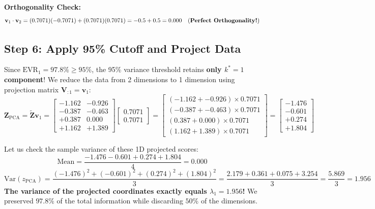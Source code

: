 \documentclass[11pt, a4paper]{article}
\begin{document}
\textbf{Orthogonality Check:}
$$\mathbf{v}_1 \cdot \mathbf{v}_2 = (0.7071)(-0.7071) + (0.7071)(0.7071) = -0.5 + 0.5 = 0.000 \quad \text{(\textbf{Perfect Orthogonality!})}$$

\subsection{Step 6: Apply 95\% Cutoff and Project Data}

Since $\text{EVR}_1 = 97.8\% \ge 95\%$, the 95\% variance threshold retains \textbf{only $k^* = 1$ component}!
We reduce the data from 2 dimensions to 1 dimension using projection matrix $\mathbf{V}_{:1} = \mathbf{v}_1$:
$$\mathbf{Z}_{\text{PCA}} = \tilde{\mathbf{Z}} \mathbf{v}_1 = \begin{bmatrix}
-1.162 & -0.926 \\[0.2em]
-0.387 & -0.463 \\[0.2em]
+0.387 & 0.000 \\[0.2em]
+1.162 & +1.389
\end{bmatrix} \begin{bmatrix} 0.7071 \\[0.2em] 0.7071 \end{bmatrix}
= \begin{bmatrix}
(-1.162 + -0.926) \times 0.7071 \\[0.2em]
(-0.387 + -0.463) \times 0.7071 \\[0.2em]
(0.387 + 0.000) \times 0.7071 \\[0.2em]
(1.162 + 1.389) \times 0.7071
\end{bmatrix}
= \begin{bmatrix}
\mathbf{-1.476} \\[0.2em]
\mathbf{-0.601} \\[0.2em]
\mathbf{+0.274} \\[0.2em]
\mathbf{+1.804}
\end{bmatrix}$$

\begin{examplebox}
Let us check the sample variance of these 1D projected scores:
$$\text{Mean} = \frac{-1.476 - 0.601 + 0.274 + 1.804}{4} = 0.000$$
$$\text{Var}(z_{\text{PCA}}) = \frac{(-1.476)^2 + (-0.601)^2 + (0.274)^2 + (1.804)^2}{3} = \frac{2.179 + 0.361 + 0.075 + 3.254}{3} = \frac{5.869}{3} = \mathbf{1.956}$$
\textbf{The variance of the projected coordinates exactly equals $\lambda_1 = 1.956$!}
We preserved $97.8\%$ of the total information while discarding $50\%$ of the dimensions.
\end{examplebox}
\end{document}
